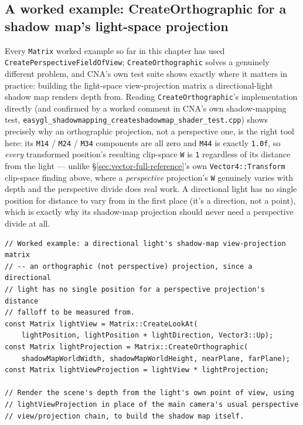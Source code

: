 \subsection{A worked example: CreateOrthographic for a shadow map's light-space projection}

Every \texttt{Matrix} worked example so far in this chapter has used
\texttt{CreatePerspectiveFieldOfView}; \texttt{CreateOrthographic} solves a genuinely different
problem, and CNA's own test suite shows exactly where it matters in practice: building the
light-space view-projection matrix a directional-light shadow map renders depth from. Reading
\texttt{CreateOrthographic}'s implementation directly (and confirmed by a worked comment in
CNA's own shadow-mapping test, \texttt{easygl\_shadowmapping\_createshadowmap\_shader\_test.cpp})
shows precisely why an orthographic projection, not a perspective one, is the right tool here:
its \texttt{M14} / \texttt{M24} / \texttt{M34} components are all zero and \texttt{M44} is exactly
\texttt{1.0f}, so \emph{every} transformed position's resulting clip-space \texttt{W} is
\texttt{1} regardless of its distance from the light --- unlike
\S\ref{sec:vector-full-reference}'s own \texttt{Vector4::Transform} clip-space finding above,
where a \emph{perspective} projection's \texttt{W} genuinely varies with depth and the
perspective divide does real work. A directional light has no single position for distance to
vary from in the first place (it's a direction, not a point), which is exactly why its
shadow-map projection should never need a perspective divide at all.

\begin{lstlisting}
// Worked example: a directional light's shadow-map view-projection matrix
// -- an orthographic (not perspective) projection, since a directional
// light has no single position for a perspective projection's distance
// falloff to be measured from.
const Matrix lightView = Matrix::CreateLookAt(
    lightPosition, lightPosition + lightDirection, Vector3::Up);
const Matrix lightProjection = Matrix::CreateOrthographic(
    shadowMapWorldWidth, shadowMapWorldHeight, nearPlane, farPlane);
const Matrix lightViewProjection = lightView * lightProjection;

// Render the scene's depth from the light's own point of view, using
// lightViewProjection in place of the main camera's usual perspective
// view/projection chain, to build the shadow map itself.
\end{lstlisting}

